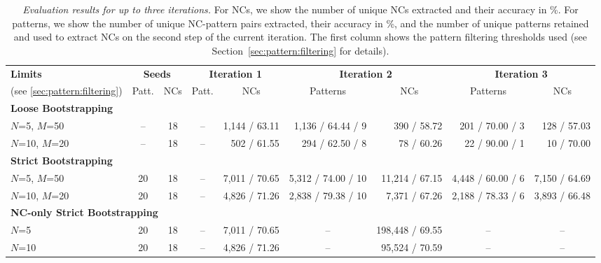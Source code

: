 \documentclass[letterpaper,11pt]{article}
\newcommand{\secref}[2][]{Section#1~\ref{#2}\xspace}
\begin{document}
\begin{table*}[tbh]
\begin{center}
\footnotesize
\begin{tabular}{|l|c@{}c|@{}r@{ }@{ }r|r@{ }@{ }@{ }r|r@{ }@{ }@{ }r|}
\hline
\textbf{Limits} & \multicolumn{2}{c|}{\bf Seeds} & \multicolumn{2}{c|}{\bf Iteration 1} & \multicolumn{2}{c|}{\bf Iteration 2} & \multicolumn{2}{c|}{\bf Iteration 3} \\
(see \ref{sec:pattern:filtering}) & \multicolumn{1}{c}{Patt.} & \multicolumn{1}{c|}{NCs} & \multicolumn{1}{c}{Patt.} & \multicolumn{1}{c|}{NCs} & \multicolumn{1}{c}{Patterns} & \multicolumn{1}{c|}{NCs} & \multicolumn{1}{c}{Patterns} & \multicolumn{1}{c|}{NCs} \\
\hline
\multicolumn{9}{l}{\textbf{Loose Bootstrapping}}\\
\hline
$N$=5, $M$=50 & \multicolumn{1}{c}{--} & 18 & \multicolumn{1}{c}{--} & 1,144 / 63.11 & 1,136 / 64.44 / 9 & 390 / 58.72 & 201 / 70.00 / 3 & 128 / 57.03 \\
$N$=10, $M$=20 & \multicolumn{1}{c}{--} & 18 & \multicolumn{1}{c}{--} & 502 / 61.55 & 294 / 62.50 / 8 & 78 / 60.26 & 22 / 90.00 / 1 & 10 / 70.00 \\
\hline
\multicolumn{9}{l}{\textbf{Strict Bootstrapping}}\\
\hline
$N$=5, $M$=50  & 20 & 18 & \multicolumn{1}{c}{--} & 7,011 / 70.65 & 5,312 / 74.00 / 10 & 11,214 / 67.15 & 4,448 / 60.00 / 6 & 7,150 / 64.69 \\
$N$=10, $M$=20 & 20 & 18 & \multicolumn{1}{c}{--} & 4,826 / 71.26 & 2,838 / 79.38 / 10 & 7,371 / 67.26 & 2,188 / 78.33 / 6 & 3,893 / 66.48 \\
\hline
\multicolumn{9}{l}{\textbf{NC-only Strict Bootstrapping}}\\
\hline
$N$=5  & 20 & 18 & \multicolumn{1}{c}{--} & 7,011 / 70.65 & \multicolumn{1}{c}{--} & 198,448 / 69.55 & \multicolumn{1}{c}{--} & \multicolumn{1}{c|}{--} \\
$N$=10 & 20 & 18 & \multicolumn{1}{c}{--} & 4,826 / 71.26 & \multicolumn{1}{c}{--} &  95,524 / 70.59 & \multicolumn{1}{c}{--} & \multicolumn{1}{c|}{--} \\
\hline
\end{tabular}
\caption{\label{tab:results}
\textit{Evaluation results  for up to  three iterations.} For  NCs, we
show the number of unique NCs  extracted and their accuracy in \%. For
patterns, we  show the  number of  unique NC-pattern  pairs extracted,
their accuracy in  \%, and the number of unique  patterns retained and
used  to extract  NCs on  the second  step of  the current  iteration.
The  first column  shows the  pattern filtering  thresholds used  (see
\secref{sec:pattern:filtering} for details).
}
\end{center}
\end{table*}
\end{document}
